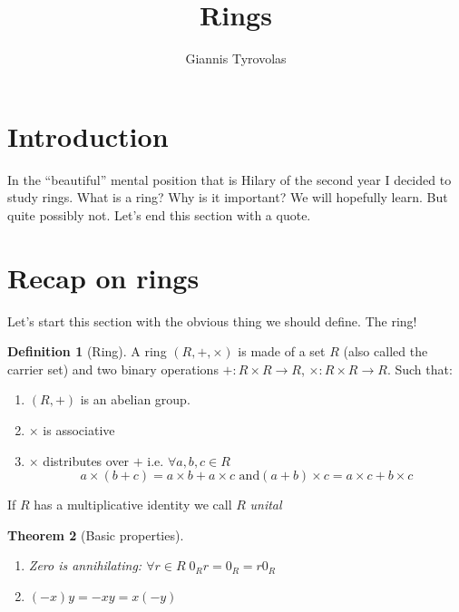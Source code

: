 \documentclass[11pt,a4paper]{article}
\title{Rings}
\author{Giannis Tyrovolas}
\newtheorem{theorem}{Theorem}[section]
\theoremstyle{definition}
\newtheorem{definition}[theorem]{Definition}
\begin{document}
\maketitle

\section{Introduction}

In the ``beautiful'' mental position that is Hilary of the second year I decided to study rings. What is a ring? Why is it important? We will hopefully learn. But quite possibly not. Let's end this section with a quote.\newline



 \par

\section{Recap on rings}

Let's start this section with the obvious thing we should define. The ring!

\begin{definition}[Ring]

A ring $(R, +, \times)$ is made of a set $R$ (also called the carrier set) and two binary operations $+: R \times R \longrightarrow R$, $\times: R \times R \longrightarrow R$. Such that:
\begin{enumerate}
	\item $(R, +)$ is an abelian group.
	\item $\times$ is associative 
	\item $\times$ distributes over $+$ i.e. $\forall a,b,c \in R$\newline
$$
	a \times (b + c) = a \times b + a \times c \text{ and} (a + b) \times c = a \times c + b \times c
$$
\end{enumerate}

If $R$ has a multiplicative identity we call $R$ \emph{unital}
\end{definition}

\begin{theorem}[Basic properties]
\begin{enumerate}
	\item Zero is annihilating: $\forall r \in R \; 0_R r = 0_R = r 0_R$
	\item $(-x)y = -xy = x(-y)$
\end{enumerate}
\end{theorem}
\end{document}
